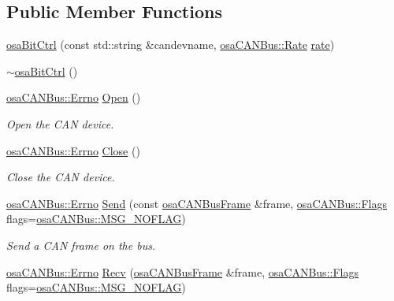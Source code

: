 \subsection*{Public Member Functions}
\begin{DoxyCompactItemize}
\item 
\hyperlink{classosa_bit_ctrl_a7e13429706eb1dc1fd497baae4a3fcd0}{osa\-Bit\-Ctrl} (const std\-::string \&candevname, \hyperlink{classosa_c_a_n_bus_ae977dbc0e1c16772395408c8e018fe6c}{osa\-C\-A\-N\-Bus\-::\-Rate} \hyperlink{classosa_c_a_n_bus_a4ff86a9ecf19161b1f34666888e0a331}{rate})
\item 
\hyperlink{classosa_bit_ctrl_aca3d2b1455d38e1b204d086a34b72596}{$\sim$osa\-Bit\-Ctrl} ()
\item 
\hyperlink{classosa_c_a_n_bus_a6fa3e95ec4c36932d0640e40e0748fde}{osa\-C\-A\-N\-Bus\-::\-Errno} \hyperlink{classosa_bit_ctrl_a15aee59c56dc544a743df2ec6c31616c}{Open} ()
\begin{DoxyCompactList}\small\item\em Open the C\-A\-N device. \end{DoxyCompactList}\item 
\hyperlink{classosa_c_a_n_bus_a6fa3e95ec4c36932d0640e40e0748fde}{osa\-C\-A\-N\-Bus\-::\-Errno} \hyperlink{classosa_bit_ctrl_ae9f22f9f65e034468625b4fb5f98c942}{Close} ()
\begin{DoxyCompactList}\small\item\em Close the C\-A\-N device. \end{DoxyCompactList}\item 
\hyperlink{classosa_c_a_n_bus_a6fa3e95ec4c36932d0640e40e0748fde}{osa\-C\-A\-N\-Bus\-::\-Errno} \hyperlink{classosa_bit_ctrl_a8bb8bcf5e56ce2e844dc9d5e5fa01b5c}{Send} (const \hyperlink{classosa_c_a_n_bus_frame}{osa\-C\-A\-N\-Bus\-Frame} \&frame, \hyperlink{classosa_c_a_n_bus_a74fe35c6059237887431f3ccece7b21b}{osa\-C\-A\-N\-Bus\-::\-Flags} flags=\hyperlink{classosa_c_a_n_bus_a74fe35c6059237887431f3ccece7b21ba30f701fa6e0dba6e274540941ccd3978}{osa\-C\-A\-N\-Bus\-::\-M\-S\-G\-\_\-\-N\-O\-F\-L\-A\-G})
\begin{DoxyCompactList}\small\item\em Send a C\-A\-N frame on the bus. \end{DoxyCompactList}\item 
\hyperlink{classosa_c_a_n_bus_a6fa3e95ec4c36932d0640e40e0748fde}{osa\-C\-A\-N\-Bus\-::\-Errno} \hyperlink{classosa_bit_ctrl_a1f333b8627d5bbe0b69afb78c432b801}{Recv} (\hyperlink{classosa_c_a_n_bus_frame}{osa\-C\-A\-N\-Bus\-Frame} \&frame, \hyperlink{classosa_c_a_n_bus_a74fe35c6059237887431f3ccece7b21b}{osa\-C\-A\-N\-Bus\-::\-Flags} flags=\hyperlink{classosa_c_a_n_bus_a74fe35c6059237887431f3ccece7b21ba30f701fa6e0dba6e274540941ccd3978}{osa\-C\-A\-N\-Bus\-::\-M\-S\-G\-\_\-\-N\-O\-F\-L\-A\-G})

\end{DoxyCompactItemize}
